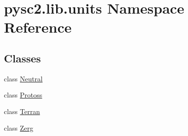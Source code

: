 \hypertarget{namespacepysc2_1_1lib_1_1units}{}\section{pysc2.\+lib.\+units Namespace Reference}
\label{namespacepysc2_1_1lib_1_1units}
\subsection*{Classes}
\begin{DoxyCompactItemize}
\item 
class \mbox{\hyperlink{classpysc2_1_1lib_1_1units_1_1_neutral}{Neutral}}
\item 
class \mbox{\hyperlink{classpysc2_1_1lib_1_1units_1_1_protoss}{Protoss}}
\item 
class \mbox{\hyperlink{classpysc2_1_1lib_1_1units_1_1_terran}{Terran}}
\item 
class \mbox{\hyperlink{classpysc2_1_1lib_1_1units_1_1_zerg}{Zerg}}
\end{DoxyCompactItemize}
